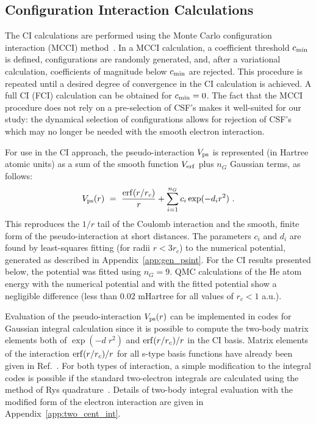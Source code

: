 \subsection{Configuration Interaction Calculations}

The CI calculations are performed using the Monte Carlo configuration 
interaction (MCCI) method~\cite{Gre1,Gre2}. 
In a MCCI calculation, a coefficient threshold $c_{\rm min}$ is defined, 
configurations are randomly generated, and, after a variational 
calculation, coefficients of magnitude below 
$c_{\rm min}$ are rejected. 
This procedure is repeated until a desired degree of convergence in the 
CI calculation is achieved. 
A full CI (FCI) calculation can be obtained for $c_{\rm min}= 0$. 
The fact that the MCCI procedure does not rely on a pre-selection of 
CSF's makes it well-suited for our study: the dynamical selection of 
configurations allows for rejection of CSF's which may no longer be
needed with the smooth electron interaction.

For use in the CI approach, the pseudo-interaction $V_{\rm ps}$ is 
represented (in Hartree atomic units) as a sum of the smooth function 
$V_{\rm erf}$ plus $n_G$ Gaussian terms, as follows:
\begin{equation}
V_{\rm ps}(r) ~=~ \frac{{\rm erf}(r/r_c)}{r} + \sum_{i = 1}^{n_G} c_i\, 
{\rm exp}(-d_i r^2) ~.
\label{eq:psfit}
\end{equation}
This reproduces the $1/r$ tail of the Coulomb interaction and the
smooth, finite form of the pseudo-interaction at short distances.
The parameters $c_i$ and $d_i$ are found by least-squares fitting 
(for radii $r<3r_c$) to the numerical potential, generated as 
described in Appendix~\ref{app:gen_psint}.
For the CI results presented below, the potential was fitted 
using $n_G=9$.
QMC calculations of the He atom energy with the numerical potential 
and with the fitted potential show a negligible difference (less than
$0.02$ mHartree for all values of $r_c<1$ a.u.).

Evaluation of the pseudo-interaction $V_{\rm ps}(r)$ can be 
implemented in codes for Gaussian integral calculation since it 
is possible to compute the two-body matrix elements both of 
$\exp(-d\; r^2)$ and ${\rm erf}(r/r_c)/r$ in the CI basis.
Matrix elements of the interaction ${\rm erf}(r/r_c)/r$ for all
s-type basis functions have already been given in Ref.~\cite{Savin:erf}.
For both types of interaction, a simple modification 
to the integral codes is possible if the standard two-electron 
integrals are calculated using the method of Rys quadrature~\cite{drk}.
Details of two-body integral evaluation with the modified form of the 
electron interaction are given in Appendix~\ref{app:two_cent_int}.

